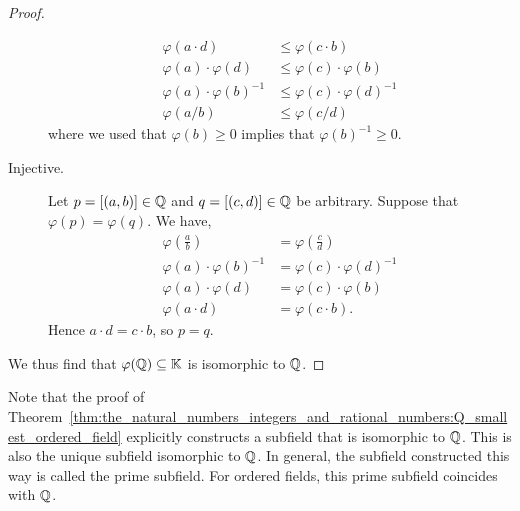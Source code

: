 \documentclass[../main.tex]{subfiles}
\begin{document}
\begin{proof}
\begin{description}
        \begin{align*}
            \varphi(a\cdot d) & \leq\varphi(c\cdot b) \\
            \varphi(a)\cdot\varphi(d) & \leq\varphi(c)\cdot\varphi(b) \\
            \varphi(a)\cdot\varphi(b)^{-1} & \leq\varphi(c)\cdot\varphi(d)^{-1} \\
            \varphi(a/b) & \leq\varphi(c/d)
        \end{align*}
        where we used that $\varphi(b)\geq0$ implies that $\varphi(b)^{-1}\geq0$.
        \item[Injective.] Let $p=[(a,b)]\in\mathbb{Q}$ and $q=[(c,d)]\in\mathbb{Q}$ be arbitrary. Suppose that $\varphi(p)=\varphi(q)$. We have,
        \begin{align*}
            \varphi\left(\frac{a}{b}\right) & =\varphi\left(\frac{c}{d}\right) \\
            \varphi(a)\cdot\varphi(b)^{-1} & =\varphi(c)\cdot\varphi(d)^{-1} \\
            \varphi(a)\cdot\varphi(d) & =\varphi(c)\cdot\varphi(b) \\
            \varphi(a\cdot d) & =\varphi(c\cdot b).
        \end{align*}
        Hence $a\cdot d=c\cdot b$, so $p=q$.
    \end{description}
    We thus find that $\varphi(\mathbb{Q})\subseteq\mathbb{K}$ is isomorphic to $\mathbb{Q}$.
\end{proof}
Note that the proof of Theorem~\ref{thm:the_natural_numbers_integers_and_rational_numbers:Q_smallest_ordered_field} explicitly constructs a subfield that is isomorphic to $\mathbb{Q}$. This is also the unique subfield isomorphic to $\mathbb{Q}$. In general, the subfield constructed this way is called the prime subfield. For ordered fields, this prime subfield coincides with $\mathbb{Q}$.
\end{document}
